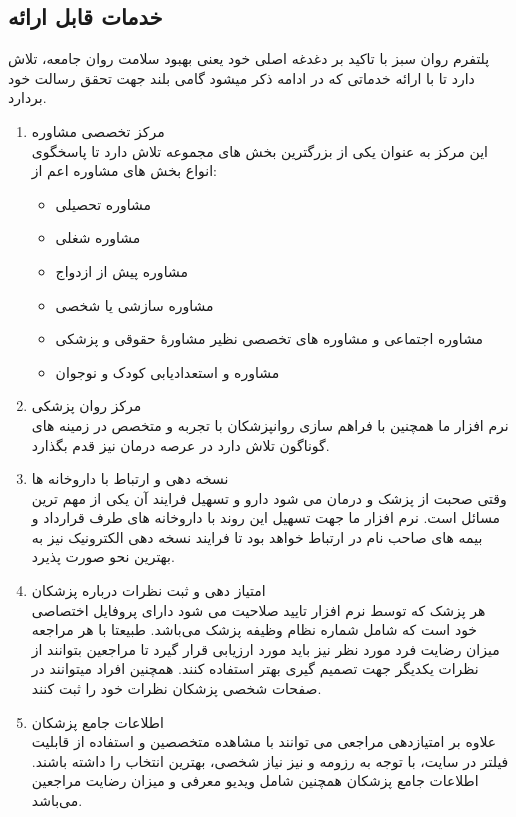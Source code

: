 \documentclass[a4paper]{article}
\begin{document}
		
		\subsection{خدمات قابل ارائه}
پلتفرم روان سبز با تاکید بر دغدغه اصلی خود یعنی بهبود سلامت روان جامعه، تلاش دارد تا با ارائه خدماتی که در ادامه ذکر میشود گامی بلند جهت تحقق رسالت خود بردارد.
		\\
		
		\begin{enumerate}
			\item مرکز تخصصی مشاوره
			\\
			این مرکز به عنوان یکی از بزرگترین بخش های مجموعه تلاش دارد تا پاسخگوی انواع بخش های مشاوره اعم از:
			\begin{itemize}
				\item مشاوره تحصیلی
				\item مشاوره شغلی
				\item مشاوره پیش از ازدواج
				\item مشاوره سازشی یا شخصی
				\item مشاوره اجتماعی و مشاوره های تخصصی نظیر مشاورۀ حقوقی و پزشکی
				\item مشاوره و استعدادیابی کودک و نوجوان
			\end{itemize}
			
			\item مرکز روان پزشکی
			\\
نرم افزار ما همچنین با فراهم سازی روانپزشکان با تجربه و متخصص در زمینه های گوناگون تلاش دارد در عرصه درمان نیز قدم بگذارد.

			\item نسخه دهی و ارتباط با داروخانه ها
			\\
			وقتی صحبت از پزشک و درمان می شود دارو و تسهیل فرایند آن یکی از مهم ترین مسائل است. نرم افزار ما جهت تسهیل این روند با داروخانه های طرف قرارداد و بیمه های صاحب نام در ارتباط خواهد بود تا فرایند نسخه دهی الکترونیک نیز به بهترین نحو صورت پذیرد.

			\item امتیاز دهی و ثبت نظرات درباره پزشکان
			\\
			هر پزشک که توسط نرم افزار تایید صلاحیت می شود دارای پروفایل اختصاصی خود است که شامل شماره نظام وظیفه پزشک می‌باشد. طبیعتا با هر مراجعه میزان رضایت فرد مورد نظر نیز باید مورد ارزیابی قرار گیرد تا مراجعین بتوانند از نظرات یکدیگر جهت تصمیم گیری بهتر استفاده کنند. همچنین افراد میتوانند در صفحات شخصی پزشکان نظرات خود را ثبت کنند.
			\item اطلاعات جامع پزشکان
			\\
			علاوه بر امتیازدهی مراجعی می توانند با مشاهده متخصصین و استفاده از قابلیت فیلتر در سایت، با توجه به رزومه و نیز نیاز شخصی، بهترین انتخاب را داشته باشند. اطلاعات جامع پزشکان همچنین شامل ویدیو معرفی و میزان رضایت مراجعین می‌باشد.
			

\end{enumerate}
\end{document}
